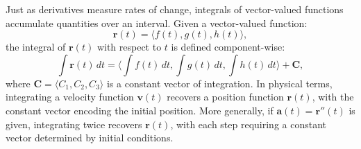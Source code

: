 \noindent Just as derivatives measure rates of change, integrals of vector-valued functions accumulate quantities over an interval. Given a vector-valued function:
\[
\mathbf{r}(t) = \langle f(t), g(t), h(t) \rangle,
\]
the integral of \( \mathbf{r}(t) \) with respect to \( t \) is defined component-wise:
\[
\int \mathbf{r}(t) \, dt = \langle \int f(t) \, dt, \int g(t) \, dt, \int h(t) \, dt \rangle + \mathbf{C},
\]
where \( \mathbf{C} = \langle C_1, C_2, C_3 \rangle \) is a constant vector of integration. In physical terms, integrating a velocity function \( \mathbf{v}(t) \) recovers a position function \( \mathbf{r}(t) \), with the constant vector encoding the initial position. More generally, if \( \mathbf{a}(t) = \mathbf{r}''(t) \) is given, integrating twice recovers \( \mathbf{r}(t) \), with each step requiring a constant vector determined by initial conditions.



